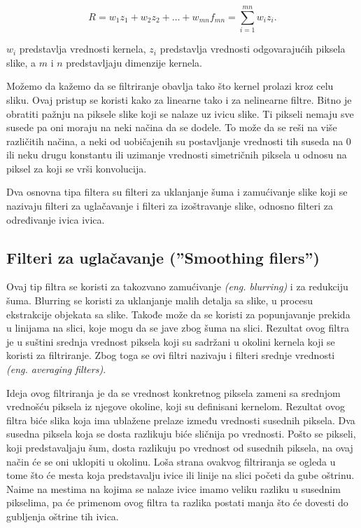 \documentclass[a4paper,12pt,titlepage]{article}
\begin{document}
\begin{equation}\label{eq:conv5}
R = w_{1}z_{1} + w_{2}z_{2} + \dots + w_{mn}f_{mn} = \sum_{i = 1}^{mn} w_{i}z_{i}.
\end{equation}

$w_{i}$ predstavlja vrednosti kernela, $z_{i}$ predstavlja vrednosti odgovarajućih piksela slike, a $m$ i $n$ predstavljaju dimenzije kernela.

Možemo da kažemo da se filtriranje obavlja tako što kernel prolazi kroz celu sliku. Ovaj pristup se koristi kako za linearne tako i za nelinearne filtre. Bitno je obratiti pažnju na piksele slike koji se nalaze uz ivicu slike. Ti pikseli nemaju sve susede pa oni moraju na neki načina da se dodele. To može da se reši na više različitih načina, a neki od uobičajenih su postavljanje vrednosti tih suseda na 0 ili neku drugu konstantu ili uzimanje vrednosti simetričnih piksela u odnosu na piksel za koji se vrši konvolucija. 

Dva osnovna tipa filtera su filteri za uklanjanje šuma i zamućivanje slike koji se nazivaju filteri za uglačavanje i filteri za izoštravanje slike, odnosno filteri za određivanje ivica ivica.

\subsection{Filteri za uglačavanje (''Smoothing filers'')}\label{3.2}%

Ovaj tip filtra se koristi za takozvano zamućivanje \emph{(eng. blurring)} i za redukciju šuma. Blurring se koristi za uklanjanje malih detalja sa slike, u procesu ekstrakcije objekata sa slike. Takođe može da se koristi za popunjavanje prekida u linijama na slici, koje mogu da se jave zbog šuma na slici. Rezultat ovog filtra je u suštini srednja vrednost piksela koji su sadržani u okolini kernela koji se koristi za filtriranje. Zbog toga se ovi filtri nazivaju i filteri srednje vrednosti \emph{(eng. averaging filters)}. 

Ideja ovog filtriranja je da se vrednost konkretnog piksela zameni sa srednjom vrednošću piksela iz njegove okoline, koji su definisani kernelom. Rezultat ovog filtra biće slika koja ima ublažene prelaze između vrednosti susednih piksela. Dva susedna piksela koja se dosta razlikuju biće sličnija po vrednosti. Pošto se pikseli, koji predstavaljaju šum, dosta razlikuju po vrednost od susednih piksela, na ovaj način će se oni uklopiti u okolinu. Loša strana ovakvog filtriranja se ogleda u tome što će mesta koja predstavalju ivice ili linije na slici početi da gube oštrinu. Naime na mestima na kojima se nalaze ivice imamo veliku razliku u susednim pikselima, pa će primenom ovog filtra ta razlika postati manja što će dovesti do gubljenja oštrine tih ivica.
\end{document}
